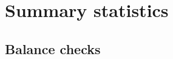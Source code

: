 \documentclass[11pt]{article}
\begin{document}
%
%
%
%

\section{Summary statistics}

	\subsection{Balance checks}
\end{document}
